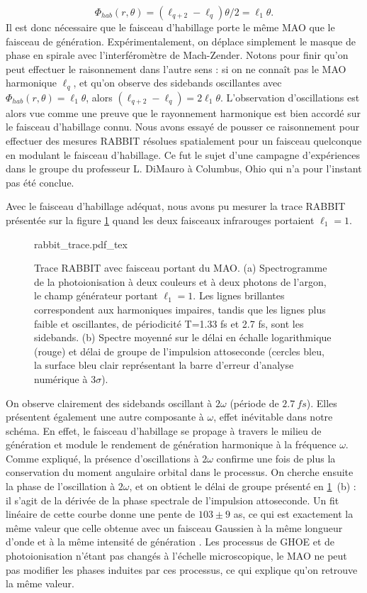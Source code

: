 \begin{equation*}
{\Phi }_{hab}(r,\theta )=\left(\ell_{q+2}-\ell_q\right)\theta/2=\ell_1\theta.
\end{equation*}
Il est donc nécessaire que le faisceau d'habillage porte le même MAO que le faisceau de génération. Expérimentalement, on déplace simplement le masque de phase en spirale avec l'interféromètre de Mach-Zender. Notons pour finir qu'on peut effectuer le raisonnement dans l'autre sens : si on ne connaît pas le MAO harmonique $\ell_q$, et qu'on observe des sidebands oscillantes avec ${\Phi }_{hab}(r,\theta )=\ell_1\theta$, alors $\left(\ell_{q+2}-\ell_q\right)=2\ell_1\theta$. L'observation d'oscillations est alors vue comme une preuve que le rayonnement harmonique est bien accordé sur le faisceau d'habillage connu. Nous avons essayé de pousser ce raisonnement pour effectuer des mesures RABBIT résolues spatialement pour un faisceau quelconque en modulant le faisceau d'habillage. Ce fut le sujet d'une campagne d'expériences dans le groupe du professeur L. DiMauro à Columbus, Ohio qui n'a pour l'instant pas été conclue.

Avec le faisceau d'habillage adéquat, nous avons pu mesurer la trace RABBIT présentée sur la figure \ref{Fig:omabbit} quand les deux faisceaux infrarouges portaient $\ell_1=1$.

\begin{figure}[!ht]
\centering
\def\svgwidth{\columnwidth}
{rabbit_trace.pdf_tex}
\caption{Trace RABBIT avec faisceau portant du MAO. (a) Spectrogramme de la photoionisation à deux couleurs et à deux photons de l'argon, le champ générateur portant $\ell_1=1$. Les lignes brillantes correspondent aux harmoniques impaires, tandis que les lignes plus faible et oscillantes, de périodicité T=1.33 fs et 2.7 fs, sont les sidebands. (b) Spectre moyenné sur le délai en échalle logarithmique (rouge) et délai de groupe de l'impulsion attoseconde (cercles bleu, la surface bleu clair représentant la barre d'erreur d'analyse numérique à $3\sigma$).}
\label{Fig:omabbit}
\end{figure}

On observe clairement des sidebands oscillant à $2\omega$ (période de  $\SI{2.7}{fs}$). Elles présentent également une autre composante à $\omega$, effet inévitable dans notre schéma. En effet, le faisceau d'habillage se propage à travers le milieu de génération et module le rendement de génération harmonique à la fréquence $\omega$. Comme expliqué, la présence d'oscillations à $2\omega$ confirme une fois de plus la conservation du moment angulaire orbital dans le processus. On cherche ensuite la phase de l'oscillation à $2\omega$, et on obtient le délai de groupe présenté en \ref{Fig:omabbit}~(b) : il s'agit de la dérivée de la phase spectrale de l'impulsion attoseconde. Un fit linéaire de cette courbe donne une pente de $103\pm9$ as, ce qui est exactement la même valeur que celle obtenue avec un faisceau Gaussien à la même longueur d'onde et à la même intensité de génération . Les processus de GHOE et de photoionisation n'étant pas changés à l'échelle microscopique, le MAO ne peut pas modifier les phases induites par ces processus, ce qui explique qu'on retrouve la même valeur.

